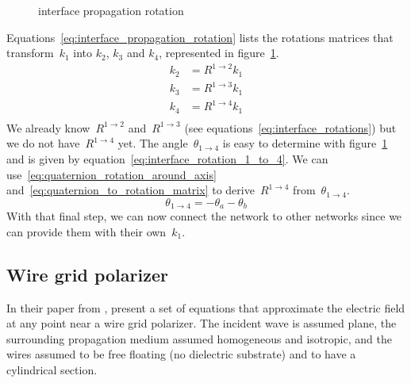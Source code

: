 \begin{figure}[hbtp]
    \centering
    \caption{\label{fig:interface_propagation_rotation}interface propagation rotation}
\end{figure}
Equations~\eqref{eq:interface_propagation_rotation} lists the rotations matrices that transform~$k_1$ into $k_2$, $k_3$ and $k_4$, represented in figure~\ref{fig:interface_propagation_rotation}.
\begin{equation}
    \begin{aligned}
        k_2 &= R^{1 \rightarrow 2} k_1 \\
        k_3 &= R^{1 \rightarrow 3} k_1 \\
        k_4 &= R^{1 \rightarrow 4} k_1 \\
    \end{aligned}
    \label{eq:interface_propagation_rotation}
\end{equation}
We already know~$R^{1 \rightarrow 2}$ and~$R^{1 \rightarrow 3}$ (see equations~\eqref{eq:interface_rotations}) but we do not have~$R^{1 \rightarrow 4}$ yet.
The angle~$\theta_{1 \rightarrow 4}$ is easy to determine with figure~\ref{fig:interface_propagation_rotation} and is given by equation~\eqref{eq:interface_rotation_1_to_4}.
We can use~\eqref{eq:quaternion_rotation_around_axis} and~\eqref{eq:quaternion_to_rotation_matrix} to derive~$R^{1 \rightarrow 4}$ from~$\theta_{1 \rightarrow 4}$.
\begin{equation}
    \theta_{1 \rightarrow 4} = -\theta_a - \theta_b
    \label{eq:interface_rotation_1_to_4}
\end{equation}
With that final step, we can now connect the network to other networks since we can provide them with their own~$k_1$.




\subsection{Wire grid polarizer}
In their paper from \citeyear{houde_2001} , \textcite{houde_2001} present a set of equations that approximate the electric field at any point near a wire grid polarizer.
The incident wave is assumed plane, the surrounding propagation medium assumed homogeneous and isotropic, and the wires assumed to be free floating (no dielectric substrate) and to have a cylindrical section.



